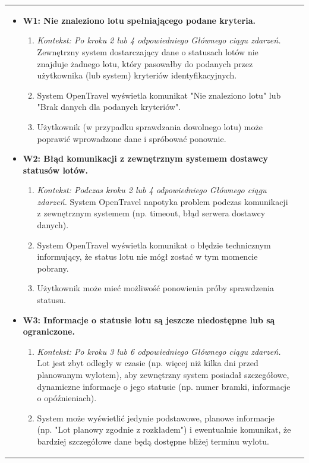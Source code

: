 \documentclass[a4paper,12pt]{article}
\begin{document}
\begin{longtable}{|p{\pierwszakolumnaszerokoscPUBLStatusLotu}|p{\drugakolumnaszerokoscPUBLStatusLotu}|}
\begin{itemize}
            \item \textbf{W1: Nie znaleziono lotu spełniającego podane kryteria.}
                \begin{enumerate} \itemsep0pt \parskip0pt \parsep0pt
                    \item \textit{Kontekst: Po kroku 2 lub 4 odpowiedniego Głównego ciągu zdarzeń.} Zewnętrzny system dostarczający dane o statusach lotów nie znajduje żadnego lotu, który pasowałby do podanych przez użytkownika (lub system) kryteriów identyfikacyjnych.
                    \item System OpenTravel wyświetla komunikat "Nie znaleziono lotu" lub "Brak danych dla podanych kryteriów".
                    \item Użytkownik (w przypadku sprawdzania dowolnego lotu) może poprawić wprowadzone dane i spróbować ponownie.
                \end{enumerate}
            \item \textbf{W2: Błąd komunikacji z zewnętrznym systemem dostawcy statusów lotów.}
                \begin{enumerate} \itemsep0pt \parskip0pt \parsep0pt
                    \item \textit{Kontekst: Podczas kroku 2 lub 4 odpowiedniego Głównego ciągu zdarzeń.} System OpenTravel napotyka problem podczas komunikacji z zewnętrznym systemem (np. timeout, błąd serwera dostawcy danych).
                    \item System OpenTravel wyświetla komunikat o błędzie technicznym informujący, że status lotu nie mógł zostać w tym momencie pobrany.
                    \item Użytkownik może mieć możliwość ponowienia próby sprawdzenia statusu.
                \end{enumerate}
            \item \textbf{W3: Informacje o statusie lotu są jeszcze niedostępne lub są ograniczone.}
                \begin{enumerate} \itemsep0pt \parskip0pt \parsep0pt
                    \item \textit{Kontekst: Po kroku 3 lub 6 odpowiedniego Głównego ciągu zdarzeń.} Lot jest zbyt odległy w czasie (np. więcej niż kilka dni przed planowanym wylotem), aby zewnętrzny system posiadał szczegółowe, dynamiczne informacje o jego statusie (np. numer bramki, informacje o opóźnieniach).
                    \item System może wyświetlić jedynie podstawowe, planowe informacje (np. "Lot planowy zgodnie z rozkładem") i ewentualnie komunikat, że bardziej szczegółowe dane będą dostępne bliżej terminu wylotu.
                \end{enumerate}
        \end{itemize} \\
\end{longtable}
\endgroup
\end{document}
